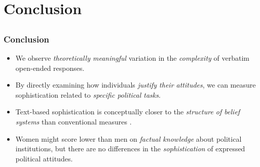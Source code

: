 \documentclass{beamer}
\begin{document}

\section{Conclusion}
\subsection{}
\begin{frame}%
  \frametitle{Conclusion}
  \begin{itemize}
\item We observe \emph{theoretically meaningful} variation in the \emph{complexity} of verbatim open-ended responses.
\item By directly examining how individuals \emph{justify their attitudes}, we can measure sophistication related to \emph{specific political tasks}.
\item Text-based sophistication is conceptually closer to the \emph{structure of belief systems} than conventional measures \citep[e.g.,][]{tetlock1983cognitive,luskin1987measuring}.

\hspace{1em}
\item Women might score lower than men on \emph{factual knowledge} about political institutions, but there are no differences in the \emph{sophistication} of expressed political attitudes.
\end{itemize}
\end{frame}
\end{document}
